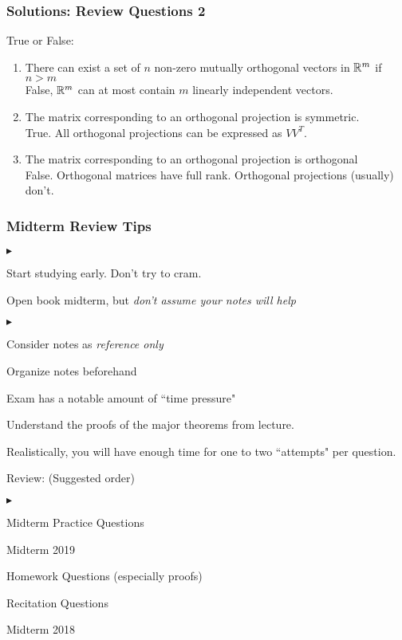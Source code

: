 \documentclass{beamer}
\renewenvironment{itemize}
\renewenvironment{enumerate}%
{\begin{list}{\arabic{enumi}.}%
      {\setlength{\leftmargin}{2.5em}%
       \setlength{\itemsep}{-\parsep}%
       \setlength{\topsep}{-\parskip}%
       \usecounter{enumi}}%
 }{\end{list}}
\renewenvironment{itemize}%
{\begin{list}{$\blacktriangleright$}%
      {\setlength{\leftmargin}{2.5em}%
       \setlength{\itemsep}{-\parsep}%
       \setlength{\topsep}{-\parskip}%
       \usecounter{enumi}}%
 }{\end{list}}
\begin{document}
\begin{frame}
\frametitle{Solutions: Review Questions 2}
True or False:
\begin{solution}
\begin{enumerate}
\item There can exist a set of $n$ non-zero mutually orthogonal vectors in $\mathbb{R}^m$ if $n > m$\\
False, $\mathbb{R}^m$ can at most contain $m$ linearly independent vectors.\\
\item The matrix corresponding to an orthogonal projection is symmetric.\\
True. All orthogonal projections can be expressed as $VV^T$.
\item The matrix corresponding to an orthogonal projection is orthogonal\\
False. Orthogonal matrices have full rank. Orthogonal projections (usually) don't.
\end{enumerate}
\end{solution}
\end{frame}

\begin{frame}
\frametitle{Midterm Review Tips}
\begin{itemize}
\item Start studying early. Don't try to cram.
\item Open book midterm, but \textit{don't assume your notes will help}
\begin{itemize}
\item Consider notes as \textit{reference only}
\item Organize notes beforehand
\item Exam has a notable amount of ``time pressure"
\end{itemize}
\item Understand the proofs of the major theorems from lecture. 
\item Realistically, you will have enough time for one to two ``attempts" per question.
\item Review: (Suggested order) 
\begin{itemize}
\item Midterm Practice Questions
\item Midterm 2019
\item Homework Questions (especially proofs)
\item Recitation Questions
\item Midterm 2018
\end{itemize}
\end{itemize}
\end{frame}
\end{document}

